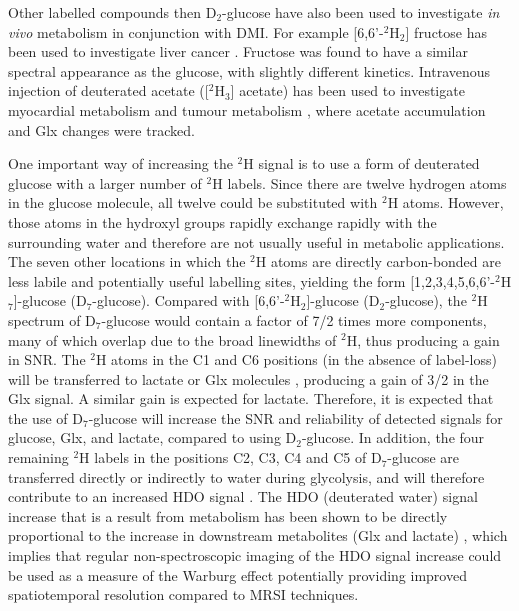 Other labelled compounds then D$_2$-glucose have also been used to investigate \textit{in vivo} metabolism in conjunction with \ac{DMI}. For example [6,6'-$^2$H$_2$] fructose has been used to investigate liver cancer \cite{Zhang202366-2H2Cancer}. Fructose was found to have a similar spectral appearance as the glucose, with slightly different kinetics. Intravenous injection of deuterated acetate ([$^2$H$_3$] acetate) has been used to investigate myocardial metabolism \cite{Wang2021NoninvasiveImaging} and tumour metabolism \cite{DeFeyter2018DeuteriumVivo}, where acetate accumulation and Glx changes were tracked.

One important way of increasing the $^2$H signal is to use a form of deuterated glucose with a larger number of $^2$H labels. Since there are twelve hydrogen atoms in the glucose molecule, all twelve could be substituted with $^2$H atoms. However, those atoms in the hydroxyl groups rapidly exchange rapidly with the surrounding water and therefore are not usually useful in metabolic applications. The seven other locations in which the $^2$H atoms are directly carbon-bonded are less labile and potentially useful labelling sites, yielding the form [1,2,3,4,5,6,6'-$^2$H$_7$]-glucose (D$_7$-glucose). Compared with [6,6'-$^2$H$_2$]-glucose (D$_2$-glucose), the $^2$H spectrum of D$_7$-glucose would contain a factor of 7/2 times more components, many of which overlap due to the broad linewidths of $^2$H, thus producing a gain in \ac{SNR}. The $^2$H atoms in the C1 and C6 positions (in the absence of label-loss) will be transferred to lactate or Glx molecules \cite{DeFeyter2020DeuteriumBrain}, producing a gain of 3/2 in the Glx signal. A similar gain is expected for lactate. Therefore, it is expected that the use of D$_7$-glucose will increase the \ac{SNR} and reliability of detected signals for glucose, Glx, and lactate, compared to using D$_2$-glucose. In addition, the four remaining $^2$H labels in the positions C2, C3, C4 and C5 of D$_7$-glucose are transferred directly or indirectly to water during glycolysis, and will therefore contribute to an increased \ac{HDO} signal \cite{Mahar2020HDOMetabolism, Mahar2021DeuteratedGlucose}. The \ac{HDO} (deuterated water) signal increase that is a result from metabolism has been shown to be directly proportional to the increase in downstream metabolites (Glx and lactate) \cite{Mahar2021DeuteratedGlucose}, which implies that regular non-spectroscopic imaging of the \ac{HDO} signal increase could be used as a measure of the Warburg effect potentially providing improved spatiotemporal resolution compared to \ac{MRSI} techniques. 


